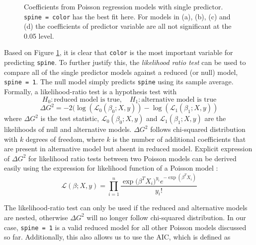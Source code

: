 \documentclass[a4paper, 12pt]{article}
\begin{document}
\begin{figure}[H]
    \centering
    \qquad
    \qquad
    \qquad
    \qquad
    \caption{Coefficients from Poisson regression models with single predictor. \texttt{spine = color} has the best fit here. For models in (a), (b), (c) and (d) the coefficients of predictor variable are all not significant at the 0.05 level.}
    \label{single-predictor-poisson-models}
\end{figure}

Based on Figure \ref{single-predictor-poisson-models}, it is clear that \texttt{color} is the most important variable for predicting \texttt{spine}. To further justify this, the \textit{likelihood ratio test} can be used to compare all of the single predictor models against a reduced (or null) model, \texttt{spine = 1}. The null model simply predicts \texttt{spine} using its sample average. \\

\noindent Formally, a likelihood-ratio test is a hypothesis test with 
$$ H_0: \text{reduced model is true}, \quad H_1: \text{alternative model is true}$$
$$ \Delta G^2 = -2(\log(\mathcal{L}_0(\beta_0; X, y)) - \log(\mathcal{L}_1(\beta_1; X, y)) $$
\noindent where $\Delta G^2$ is the test statistic, $\mathcal{L}_0(\beta_0; X, y)$ and $\mathcal{L}_1(\beta_1; X, y)$ are the likelihoods of null and alternative models. $\Delta G^2$ follows chi-squared distribution with $k$ degrees of freedom, where $k$ is the number of additional coefficients that are present in alternative model but absent in reduced model. Explicit expression of $\Delta G^2$ for likelihood ratio tests between two Poisson models can be derived easily using the expression for likelihood function of a Poisson model :
$$\mathcal{L}(\beta; X, y) = {\displaystyle \prod_{i=1}^{n}  \frac{{\exp(\beta^TX_i})^{y_i} e^{-\exp(\beta^TX_i)} }{y_i!}}$$

\noindent The likelihood-ratio test can only be used if the reduced and alternative models are nested, otherwise $\Delta G^2$ will no longer follow chi-squared distribution. In our case, \texttt{spine = 1} is a valid reduced model for all other Poisson models discussed so far. Additionally, this also allows us to use the AIC, which is defined as 
\end{document}
